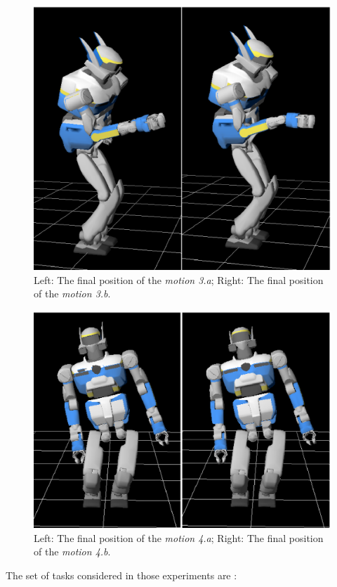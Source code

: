 \documentclass[letterpaper, 10pt, conference]{ieeeconf}      %
\begin{document}
\begin{figure}[t]
\begin{center}
\includegraphics[width=0.55\linewidth]{img/spotDiff2bis.ps}
\end{center}
\caption{Left: The final position of the \emph{motion 3.a}; Right: The final position of the \emph{motion 3.b}.}
\label{fig:spotDiff2}
\vspace{-3pt}
\end{figure}
\begin{figure}[t]
\begin{center}
\includegraphics[width=0.66\linewidth]{img/spotDiff3.ps}
\end{center}
\caption{Left: The final position of the \emph{motion 4.a}; Right: The final position of the \emph{motion 4.b}.}
\label{fig:spotDiff3}
\end{figure}

The set of tasks considered in those experiments are :
\end{document}
